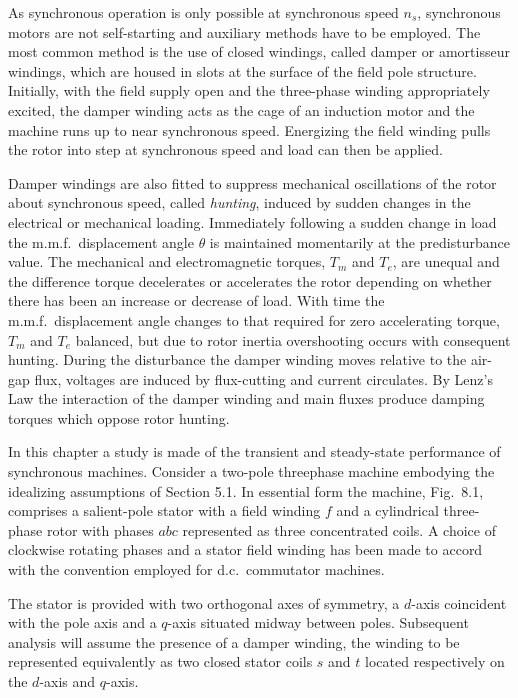 \documentclass[a4paper,numbers=noenddot,12pt]{scrbook}
\begin{document}
    As synchronous operation is only possible at synchronous speed $n_s$, synchronous motors are not self-starting and auxiliary methods have to be employed. The most common method is the use of closed windings, called damper or amortisseur windings, which are housed in slots at the surface of the field pole structure. Initially, with the field supply open and the three-phase winding appropriately excited, the damper winding acts as the cage of an induction motor and the machine runs up to near synchronous speed. Energizing the field winding pulls the rotor into step at synchronous speed and load can then be applied.

    Damper windings are also fitted to suppress mechanical oscillations of the rotor about synchronous speed, called \textit{hunting}, induced by sudden changes in the electrical or mechanical loading. Immediately following a sudden change in load the m.m.f.\ displacement angle $\theta$ is maintained momentarily at the predisturbance value. The mechanical and electromagnetic torques, $T_m$ and $T_e$, are unequal and the difference torque decelerates or accelerates the rotor depending on whether
    there has been an increase or decrease of load. With time the m.m.f.\ displacement angle changes to that required for zero accelerating torque, $T_m$ and $T_e$ balanced, but due to rotor inertia overshooting occurs with consequent hunting. During the disturbance the damper winding moves relative to the air-gap flux, voltages are induced by flux-cutting and current circulates. By Lenz's Law the interaction of the damper winding and main fluxes produce damping torques which oppose rotor hunting.

    In this chapter a study is made of the transient and steady-state performance of synchronous machines. Consider a two-pole three­phase machine embodying the idealizing assumptions of Section 5.1. In essential form the machine, Fig.\ 8.1, comprises a salient-pole stator with a field winding $f$ and a cylindrical three-phase rotor with phases $abc$ represented as three concentrated coils. A choice of clockwise rotating phases and a stator field winding has been made to accord with the convention employed for d.c.\ commutator machines.

    The stator is provided with two orthogonal axes of symmetry, a $d$-axis coincident with the pole axis and a $q$-axis situated midway between poles. Subsequent analysis will assume the presence of a damper winding, the winding to be represented equivalently as two closed stator coils $s$ and $t$ located respectively on the $d$-axis and $q$-axis.
\end{document}
